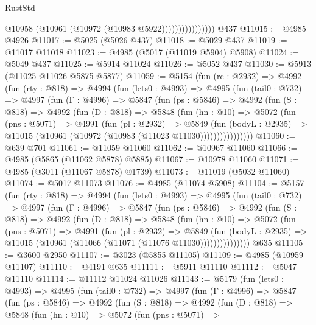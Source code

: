 \begin{lexlean}{RustStd}
\begin{coremodule}
                            @10958 (@10961 (@10972 (@10983 @5922))))))))))))))))
    @437
@11015 := @4985 @4926
@11017 := @5025 (@5026 @437)
@11018 := @5029 @437
@11019 := @11017 @11018
@11023 := @4985 (@5017 (@11019 @5904) @5908)
@11024 := @5049 @437
@11025 := @5914 @11024
@11026 := @5052 @437
@11030 := @5913 (@11025 @11026 @5875 @5877)
@11059 := @5154
    (fun (rc : @2932) =>
    @4992
      (fun (rty : @818) =>
      @4994
        (fun (lets0 : @4993) =>
        @4995
          (fun (tail0 : @732) =>
          @4997
            (fun (Γ : @4996) =>
            @5847
              (fun (ps : @5846) =>
              @4992
                (fun (S : @818) =>
                @4992
                  (fun (D : @818) =>
                  @5848
                    (fun (hn : @10) =>
                    @5072
                      (fun (pns : @5071) =>
                      @4991
                        (fun (pl : @2932) =>
                        @5849
                          (fun (bodyL : @2935) =>
                          @11015 (@10961 (@10972 (@10983 (@11023 @11030))))))))))))))))
@11060 := @639 @701
@11061 := @11059 @11060
@11062 := @10967 @11060
@11066 := @4985 (@5865 (@11062 @5878) @5885)
@11067 := @10978 @11060
@11071 := @4985 (@3011 (@11067 @5878) @1739)
@11073 := @11019 (@5032 @11060)
@11074 := @5017 @11073
@11076 := @4985 (@11074 @5908)
@11104 := @5157
    (fun (rty : @818) =>
    @4994
      (fun (lets0 : @4993) =>
      @4995
        (fun (tail0 : @732) =>
        @4997
          (fun (Γ : @4996) =>
          @5847
            (fun (ps : @5846) =>
            @4992
              (fun (S : @818) =>
              @4992
                (fun (D : @818) =>
                @5848
                  (fun (hn : @10) =>
                  @5072
                    (fun (pns : @5071) =>
                    @4991
                      (fun (pl : @2932) =>
                      @5849
                        (fun (bodyL : @2935) =>
                        @11015 (@10961 (@11066 (@11071 (@11076 @11030)))))))))))))))
    @635
@11105 := @3600 @2950
@11107 := @3023 (@5855 @11105)
@11109 := @4985 (@10959 @11107)
@11110 := @4191 @635
@11111 := @5911 @11110
@11112 := @5047 @11110
@11114 := @11112 @11024 @11026
@11143 := @5179
    (fun (lets0 : @4993) =>
    @4995
      (fun (tail0 : @732) =>
      @4997
        (fun (Γ : @4996) =>
        @5847
          (fun (ps : @5846) =>
          @4992
            (fun (S : @818) =>
            @4992
              (fun (D : @818) =>
              @5848
                (fun (hn : @10) =>
                @5072
                  (fun (pns : @5071) =>

\end{coremodule}
\end{lexlean}
